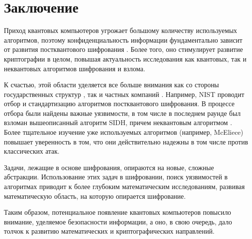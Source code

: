 \chapter{Заключение}

Приход квантовых компьютеров угрожает большому количеству используемых алгоритмов, поэтому конфиденциальность информации фундаментально зависит от развития постквантового шифрования .
Более того, оно стимулирует развитие криптографии в целом, повышая актуальность исследования как квантовых, так и неквантовых алгоритмов шифрования и взлома.

К счастью, этой области уделяется все больше внимания как со стороны государственных структур \cite{nsa_pqc}, так и частных компаний \cite{nvidia_pqc}. Например, NIST проводит отбор и стандартизацию алгоритмов постквантового шифрования. В процессе отбора были найдены важные уязвимости, в том числе в последнем раунде был взломан вышеописанный алгоритм SIDH, причем неквантовым алгоритмом \cite{sidh_broken}. Более тщательное изучение уже используемых алгоритмов (например, McEliece) повышает уверенность в том, что они действительно надежны в том числе против классических атак.

Задачи, лежащие в основе шифрования, опираются на новые, сложные абстракции. Использование этих задач в шифровании, поиск уязвимостей в алгоритмах приводит к более глубоким математическим исследованиям, развивая математическую область, на которую опирается шифрование.

Таким образом, потенциальное появление квантовых компьютеров повысило внимание, уделяемое безопасности информации, а оно, в свою очередь, дало толчок к развитию математических и криптографических направлений.

\endinput